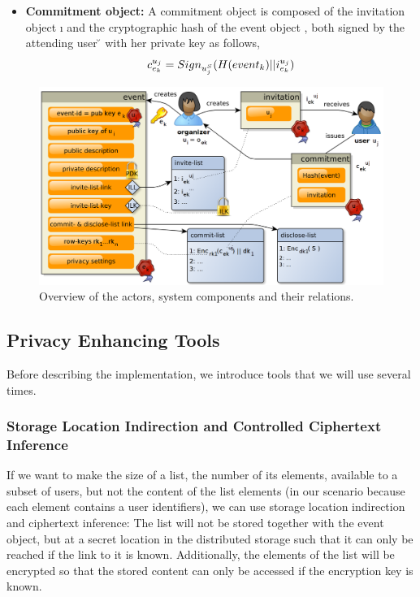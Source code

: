 \begin{itemize}
\item \textbf{Commitment object:} 
A commitment object is composed of the invitation object \i{} and the cryptographic 
hash of the event object \eo{}, both signed by the attending 
user \u{} with her private key \uS{} as follows,
\begin{equation*}
		\cm{} = Sign_{\uS{}}(H(\eo{})||\i{})
\end{equation*}
\end{itemize}

\begin{figure}
  \centering
  \includegraphics[width=.88\linewidth]{images/event-invitations-dosns/system-implementation}
  \caption{Overview of the actors, system components and their relations.}
  \label{figure:event-invitations-dosns:overview-objects-actions}
\end{figure}


\subsection{Privacy Enhancing Tools}
	\label{subsection:event-invitations-dosns:privacy-enhancing-tools}
Before describing the implementation, we introduce tools that we will use several times.

\subsubsection{Storage Location Indirection and Controlled Ciphertext Inference}
	\label{subsubsection:event-invitations-dosns:indirection-and-ciphertext-inferences}
If we want to make the size of a list, \ie the number of its elements, available 
to a subset of users, but not the content of 
the list elements (in our scenario because each element contains 
a user identifiers), we can use storage location indirection and ciphertext inference:
%
The list will not be stored together with the event object, but at a secret location in the distributed storage such that it can only 
be reached if the link to it is known. Additionally, the elements of the list will be encrypted so 
that the stored content can only be accessed if the encryption key is known. 

